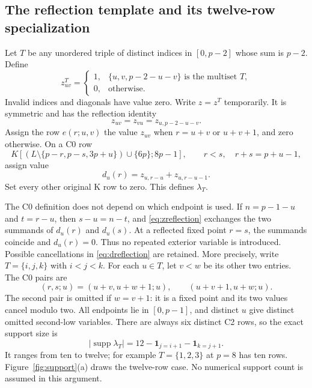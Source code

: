 \documentclass[11pt]{article}
\theoremstyle{definition}
\theoremstyle{remark}
\newcommand{\supp}{\operatorname{supp}}
\begin{document}
\subsection{The reflection template and its twelve-row specialization}

Let $T$ be any unordered triple of distinct indices in $[0,p-2]$ whose
sum is $p-2$. Define
\[
 z^T_{uv}=
 \begin{cases}
  1,&\{u,v,p-2-u-v\}\text{ is the multiset }T,\\
  0,&\text{otherwise}.
 \end{cases}
\]
Invalid indices and diagonals have value zero. Write $z=z^T$ temporarily.
It is symmetric and has the reflection identity
\begin{equation}\label{eq:zreflection}
 z_{uv}=z_{vu}=z_{u,p-2-u-v}.
\end{equation}
Assign the row $e(r;u,v)$ the value $z_{uv}$ when $r=u+v$ or $u+v+1$,
and zero otherwise. On a C0 row
\[
 K[(L\setminus\{p-r,p-s,3p+u\})\cup\{6p\};8p-1],
 \qquad r<s,\quad r+s=p+u-1,
\]
assign value
\begin{equation}\label{eq:dreflection}
 d_u(r)=z_{u,r-u}+z_{u,r-u-1}.
\end{equation}
Set every other original K row to zero. This defines $\lambda_T$.

The C0 definition does not depend on which endpoint is used. If
$n=p-1-u$ and $t=r-u$, then $s-u=n-t$, and
\eqref{eq:zreflection} exchanges the two summands of $d_u(r)$ and
$d_u(s)$. At a reflected fixed point $r=s$, the summands coincide and
$d_u(r)=0$. Thus no repeated exterior variable is introduced. Possible
cancellations in \eqref{eq:dreflection} are retained. More precisely, write
$T=\{i,j,k\}$ with $i<j<k$. For each $u\in T$, let $v<w$ be its other
two entries. The C0 pairs are
\[
 (r,s;u)=(u+v,u+w+1;u),\qquad (u+v+1,u+w;u).
\]
The second pair is omitted if $w=v+1$: it is a fixed point and its two
values cancel modulo two. All endpoints lie in $[0,p-1]$, and distinct
$u$ give distinct omitted second-low variables. There are always six
distinct C2 rows, so the exact support size is
\begin{equation}\label{eq:template-support}
 |\supp\lambda_T|=12-\mathbf1_{j=i+1}-\mathbf1_{k=j+1}.
\end{equation}
It ranges from ten to twelve; for example $T=\{1,2,3\}$ at $p=8$ has
ten rows. Figure~\ref{fig:support}(a) draws the twelve-row case. No numerical
support count is assumed in this argument.
\end{document}
